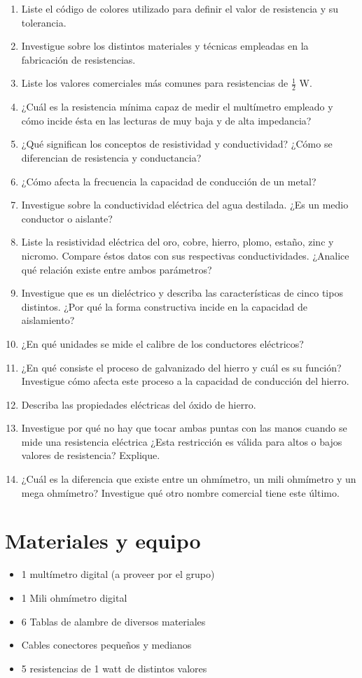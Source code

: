 \documentclass{report}
\newcommand{\mat}{Materiales y equipo}
\begin{document}
\begin{enumerate}
\item	Liste el código de colores utilizado para definir el valor de resistencia y su tolerancia.
\item	Investigue sobre los distintos materiales y técnicas empleadas en la fabricación de resistencias.
\item Liste los valores comerciales más comunes para resistencias de $\frac{1}{2}$ \si{\watt}.
\item	¿Cuál es la resistencia mínima capaz de medir el multímetro empleado y cómo incide ésta en las lecturas de muy baja y de alta impedancia?
\item	¿Qué significan los conceptos de resistividad y conductividad? ¿Cómo se diferencian de resistencia y conductancia?
\item	¿Cómo afecta la frecuencia la capacidad de conducción de un metal?
\item	Investigue sobre la conductividad eléctrica del agua destilada. ¿Es un medio conductor o aislante?
\item	Liste la resistividad eléctrica del oro, cobre, hierro, plomo, estaño, zinc y nicromo. Compare éstos datos con sus respectivas conductividades. ¿Analice qué relación existe entre ambos parámetros?
\item	Investigue que es un dieléctrico y describa las características de cinco tipos distintos. ¿Por qué la forma constructiva incide en la capacidad de aislamiento?
\item	¿En qué unidades se mide el calibre de los conductores eléctricos?
\item	¿En qué consiste el proceso de galvanizado del hierro y cuál es su función? Investigue cómo afecta este proceso a la capacidad de conducción del hierro.
\item	Describa las propiedades eléctricas del óxido de hierro.
\item	Investigue por qué no hay que tocar ambas puntas con las manos cuando se mide una resistencia eléctrica ¿Esta restricción es válida para altos o bajos valores de resistencia? Explique.
\item	¿Cuál es la diferencia que existe entre un ohmímetro, un mili ohmímetro y un mega ohmímetro? Investigue qué otro nombre comercial tiene este último.
\end{enumerate}
\section{\mat}
\begin{itemize}
\item	1 multímetro digital (a proveer por el grupo)
\item	1 Mili ohmímetro digital
\item	6 Tablas de alambre de diversos materiales
\item	Cables conectores pequeños y medianos
\item	5 resistencias de 1 watt de distintos valores
\end{itemize}
\end{document}
